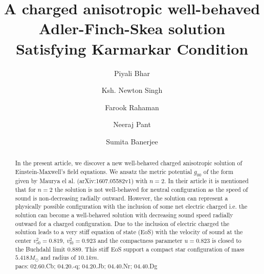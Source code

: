 \documentclass[preprintnumbers,amsmath,amssymb,floatfix,9pt,prd,twocolumn,
superscriptaddress,nofootinbib]{revtex4}
\begin{document}
\title{A charged anisotropic well-behaved Adler-Finch-Skea solution Satisfying Karmarkar Condition}

\author{Piyali Bhar}
 

\author{Ksh. Newton Singh}

\author{Farook Rahaman}

\author{Neeraj Pant}
\author{Sumita Banerjee }

\begin{abstract}\noindent
In the present article, we discover a new well-behaved charged anisotropic solution of Einstein-Maxwell's field equations. We ansatz the metric potential $g_{00}$ of the form given by Maurya el al. (arXiv:1607.05582v1) with $n=2$. In their article it is mentioned that for $n=2$ the solution is not well-behaved for neutral configuration as the speed of sound is non-decreasing radially outward. However, the solution can represent a physically possible configuration with the inclusion of some net electric charged i.e. the solution can become a well-behaved solution with decreasing sound speed radially outward for a charged configuration. Due to the inclusion of electric charged the solution leads to a very stiff equation of state (EoS) with the velocity of sound at the center $v_{r0}^2=0.819, ~v_{t0}^2=0.923$ and the compactness parameter $u=0.823$ is closed to the Buchdahl limit 0.889. This stiff EoS support a compact star configuration of mass $5.418M_\odot$ and radius of $10.1 km$.\\

pacs: 02.60.Cb;  04.20.-q;  04.20.Jb;  04.40.Nr;  04.40.Dg
\end{abstract}



\maketitle
\end{document}
